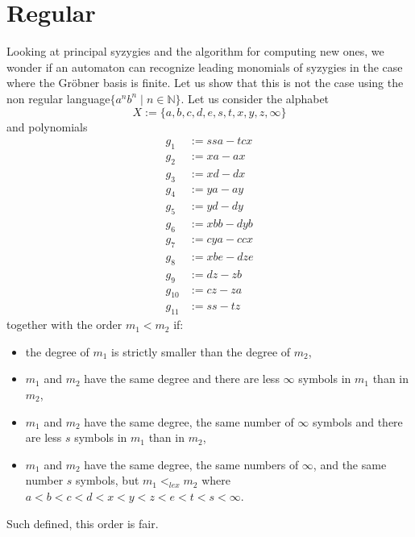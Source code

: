 \documentclass[sigconf]{acmart}
\theoremstyle{plain}
\theoremstyle{definition}
\theoremstyle{remark}
\newcommand{\N}{\mathbb{N}}
\begin{document}
\section{Regular}

Looking at principal syzygies and the algorithm for computing new ones, we wonder if an automaton can recognize leading monomials of syzygies in the case where the Gröbner basis is finite. Let us show that this is not the case using the non regular language\linebreak $\{a^nb^n \;|\; n \in \N\}$. Let us consider the alphabet 
$$X:=\{a, b, c, d, e, s, t, x, y, z, \infty\}$$
and polynomials
\begin{align*}
g_1 & := ssa - tcx \\
g_2 & := xa - ax \\
g_3 & := xd - dx \\
g_4 & := ya - ay \\
g_5 & := yd - dy \\
g_6 & := xbb - dyb \\
g_7 & := cya - ccx \\
g_8 & := xbe - dze \\
g_9 & := dz - zb \\
g_{10} & := cz - za \\
g_{11} & := ss-tz
\end{align*}
together with the order $m_1 < m_2$ if:
\begin{itemize}
\item the degree of $m_1$ is strictly smaller than the degree of $m_2$,
\item $m_1$ and $m_2$ have the same degree and there are less $\infty$ symbols in $m_1$ than in $m_2$,
\item $m_1$ and $m_2$ have the same degree, the same number of $\infty$ symbols and there are less $s$ symbols in $m_1$ than in $m_2$,
\item $m_1$ and $m_2$ have the same degree, the same numbers of $\infty$, and the same number $s$ symbols, but
$m_1 <_{lex} m_2$ where\\ $a < b < c < d < x < y < z < e < t < s < \infty$.
\end{itemize}
Such defined, this order is fair.
\end{document}
